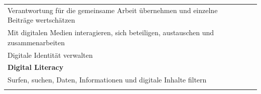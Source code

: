 \documentclass[
  ngerman,
  paper=a4,
,captions=tableheading
]{scrartcl}
\begin{document}
\begin{longtable}[]{@{}lll@{}}
\begin{minipage}[t]{0.72\columnwidth}
Verantwortung für die gemeinsame Arbeit übernehmen und einzelne Beiträge
wertschätzen\strut
\end{minipage} & \begin{minipage}[t]{0.10\columnwidth}\raggedright
\strut
\end{minipage} & \begin{minipage}[t]{0.10\columnwidth}\raggedright
\strut
\end{minipage}\tabularnewline
\begin{minipage}[t]{0.72\columnwidth}\raggedright
Mit digitalen Medien interagieren, sich beteiligen, austauschen und
zusammenarbeiten\strut
\end{minipage} & \begin{minipage}[t]{0.10\columnwidth}\raggedright
\strut
\end{minipage} & \begin{minipage}[t]{0.10\columnwidth}\raggedright
\strut
\end{minipage}\tabularnewline
\begin{minipage}[t]{0.72\columnwidth}\raggedright
Digitale Identität verwalten\strut
\end{minipage} & \begin{minipage}[t]{0.10\columnwidth}\raggedright
\strut
\end{minipage} & \begin{minipage}[t]{0.10\columnwidth}\raggedright
\strut
\end{minipage}\tabularnewline
\begin{minipage}[t]{0.72\columnwidth}\raggedright
\textbf{Digital Literacy}\strut
\end{minipage} & \begin{minipage}[t]{0.10\columnwidth}\raggedright
\strut
\end{minipage} & \begin{minipage}[t]{0.10\columnwidth}\raggedright
\strut
\end{minipage}\tabularnewline
\begin{minipage}[t]{0.72\columnwidth}\raggedright
Surfen, suchen, Daten, Informationen und digitale Inhalte filtern\strut
\end{minipage} & \begin{minipage}[t]{0.10\columnwidth}\raggedright
\strut
\end{minipage} & \begin{minipage}[t]{0.10\columnwidth}\raggedright
\strut
\end{minipage}\tabularnewline
\begin{minipage}[t]{0.72\columnwidth}\raggedright

\end{minipage}
\end{longtable}
\end{document}
